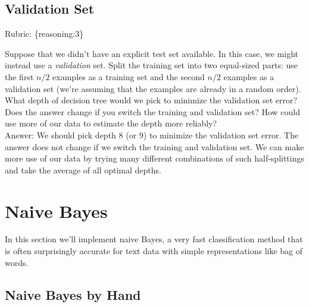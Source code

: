 \documentclass{article}
\def\rubric#1{\gre{Rubric: \{#1\}}}{}
\def\blu#1{{\color{blu}#1}}
\def\gre#1{{\color{gre}#1}}
\def\ans#1{\gre{Answer: #1}}{}
\begin{document}
\subsection{Validation Set}
\rubric{reasoning:3}

Suppose that we didn't have an explicit test set available. In this case, we might instead use a \emph{validation} set. Split the training set into two equal-sized parts: use the first $n/2$ examples as a training set and the second $n/2$ examples as a validation set (we're assuming that the examples are already in a random order). \blu{What depth of decision tree would we pick to minimize the validation set error? Does the answer change if you switch the training and validation set? How could use more of our data to  estimate the depth more reliably?} \\
\ans{We should pick depth $8$ (or $9$) to minimize the validation set error. The answer does not change if we switch the training and validation set. We can make more use of our data by trying many different combinations of such half-splittings and take the average of all optimal depths.}

\section{Naive Bayes}

In this section we'll implement naive Bayes, a very fast classification method that is often surprisingly accurate for text data with simple representations like bag of words.



\subsection{Naive Bayes by Hand}
\end{document}
